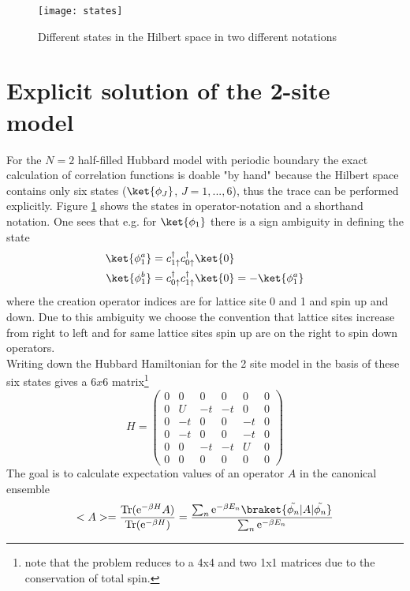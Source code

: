 

	\begin{figure}[H]
		\centering
		\texttt{[image: states]} \qquad \qquad 
		\caption{Different states in the Hilbert space in two different notations}
		\label{fig1}
	\end{figure}
\section{Explicit solution of the 2-site model}
For the $N=2$ half-filled Hubbard model with periodic boundary the exact calculation of correlation functions is doable "by hand" because the Hilbert space contains only six states ($\ket{\phi_J}$, $J=1,...,6$), thus the trace can be performed explicitly. Figure \ref{fig1} shows the states in operator-notation and a shorthand notation. One sees that e.g. for $\ket{\phi_1}$ there is a sign ambiguity in defining the state
\begin{align*}
	\ket{\phi_1^a} &= c^{\dagger}_{1\uparrow}c^{\dagger}_{0\uparrow}\ket{0} \\
	\ket{\phi_1^b} &= c^{\dagger}_{0\uparrow}c^{\dagger}_{1\uparrow}\ket{0} = -\ket{\phi_1^a} 
\end{align*}
where the creation operator indices are for lattice site 0 and 1 and spin up and down. Due to this ambiguity we choose the convention that lattice sites increase from right to left and for same lattice sites spin up are on the right to spin down operators.\\ Writing down the Hubbard Hamiltonian for the 2 site model in the basis of these six states gives a $6x6$ matrix\footnote{note that the problem reduces to a 4x4 and two 1x1 matrices due to the conservation of total spin.}
\begin{equation*}
	H=
\begin{pmatrix}
	0 & 0 & 0&0&0&0\\
	0 & U & -t&-t&0&0\\
	0 & -t & 0&0&-t&0\\
	0 & -t & 0&0&-t&0\\
	0 & 0 & -t&-t&U&0\\
	0 & 0 & 0&0&0&0 
\end{pmatrix}
\end{equation*}
The goal is to calculate expectation values of an operator $A$ in the canonical ensemble
\begin{equation}
	<A> = \frac{\text{Tr}(\text{e}^{-\beta H}A)}{\text{Tr}(\text{e}^{-\beta H})} = \frac{\sum_{n}^{}\text{e}^{-\beta E_n}\braket{\tilde{\phi_n}|A|\tilde{\phi_n}}}{\sum_{n}^{}\text{e}^{-\beta E_n}}\label{expvalue}
\end{equation}
